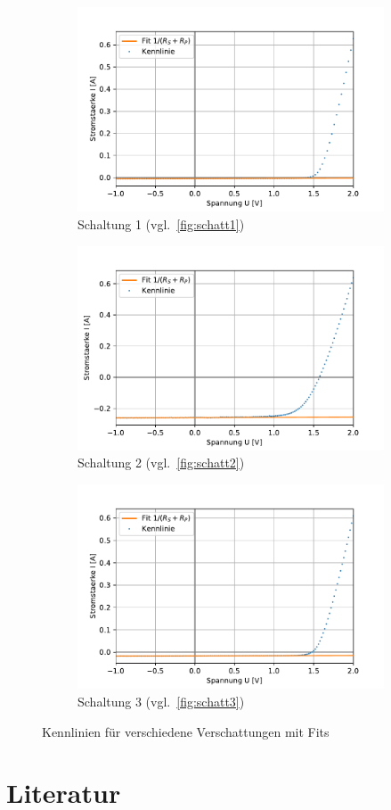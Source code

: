 \documentclass[slug=SZ, room=Hermann-Krone-Bau\,\ Labor\ 1.25, supervisor=Martin\ Kroll]{../../Lab_Report_LaTeX/lab_report}
\begin{document}
\begin{figure}[H]\centering
	\begin{subfigure}[b]{1\textwidth}\centering
		\includegraphics[width=.5\columnwidth]{figs/python/3x3_verschattung_1_rsrp.pdf}
		\caption{Schaltung 1 (vgl.~\ref{fig:schatt1})}
		\label{diag:verschattung1fit}
	\end{subfigure}
	\begin{subfigure}[b]{1\textwidth}\centering
		\includegraphics[width=.5\columnwidth]{figs/python/3x3_verschattung_2_rsrp.pdf}
		\caption{Schaltung 2 (vgl.~\ref{fig:schatt2})}
		\label{diag:verschattung2fit}
	\end{subfigure}
	\begin{subfigure}[b]{1\textwidth}\centering
		\includegraphics[width=.5\columnwidth]{figs/python/3x3_verschattung_3_rsrp.pdf}
		\caption{Schaltung 3 (vgl.~\ref{fig:schatt3})}
		\label{diag:verschattung3fit}
	\end{subfigure}
	\caption{Kennlinien für verschiedene Verschattungen mit Fits}
	\label{fig:verschattungfit}
\end{figure}

\section{Literatur}

\label{sec:literatur}

\printbibliography
\end{document}
